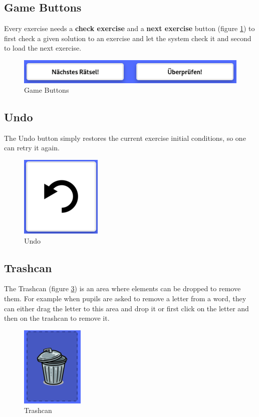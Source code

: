 \subsection*{Game Buttons}
\label{subsection:gameButtons}
Every exercise needs a \textbf{check exercise} and a \textbf{next exercise} button (figure \ref{fig:gameButtons}) to first check a given solution to an exercise and let the system check it and second to load the next exercise.

\begin{figure} 
    \centering
    \includegraphics[width=0.6 \columnwidth]{figures/game_buttons.png}
    \caption{Game Buttons} 
    \label{fig:gameButtons} 
\end{figure}

\subsection*{Undo}
The Undo button simply restores the current exercise initial conditions, so one can retry it again.

\begin{figure} 
    \centering
    \includegraphics[width=0.1 \columnwidth]{figures/undo.png}
    \caption{Undo} 
    \label{fig:undo} 
\end{figure}

\subsection*{Trashcan}
The Trashcan (figure \ref{fig:trashcan}) is an area where elements can be dropped to remove them. For example when pupils are asked to remove a letter from a word, they can either drag the letter to this area and drop it or first click on the letter and then on the trashcan to remove it.

\begin{figure} 
    \centering
    \includegraphics[width=0.1 \columnwidth]{figures/trashcan.png}
    \caption{Trashcan} 
    \label{fig:trashcan} 
\end{figure}

